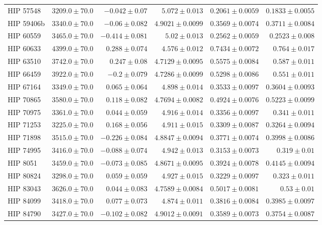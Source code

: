 \begin{longtable*}{lrrrrr}
HIP 57548 & $3209.0\pm 70.0$ & $-0.042\pm 0.07$ & $5.072\pm 0.013$ & $0.2061\pm 0.0059$ & $0.1833\pm 0.0055$ \\ 
HIP 59406b & $3340.0\pm 70.0$ & $-0.06\pm 0.082$ & $4.9021\pm 0.0099$ & $0.3569\pm 0.0074$ & $0.3711\pm 0.0084$ \\ 
HIP 60559 & $3465.0\pm 70.0$ & $-0.414\pm 0.081$ & $5.02\pm 0.013$ & $0.2562\pm 0.0059$ & $0.2523\pm 0.008$ \\ 
HIP 60633 & $4399.0\pm 70.0$ & $0.288\pm 0.074$ & $4.576\pm 0.012$ & $0.7434\pm 0.0072$ & $0.764\pm 0.017$ \\ 
HIP 63510 & $3742.0\pm 70.0$ & $0.247\pm 0.08$ & $4.7129\pm 0.0095$ & $0.5575\pm 0.0084$ & $0.587\pm 0.011$ \\ 
HIP 66459 & $3922.0\pm 70.0$ & $-0.2\pm 0.079$ & $4.7286\pm 0.0099$ & $0.5298\pm 0.0086$ & $0.551\pm 0.011$ \\ 
HIP 67164 & $3349.0\pm 70.0$ & $0.065\pm 0.064$ & $4.898\pm 0.014$ & $0.3533\pm 0.0097$ & $0.3604\pm 0.0093$ \\ 
HIP 70865 & $3580.0\pm 70.0$ & $0.118\pm 0.082$ & $4.7694\pm 0.0082$ & $0.4924\pm 0.0076$ & $0.5223\pm 0.0099$ \\ 
HIP 70975 & $3361.0\pm 70.0$ & $0.044\pm 0.059$ & $4.916\pm 0.014$ & $0.3356\pm 0.0097$ & $0.341\pm 0.011$ \\ 
HIP 71253 & $3225.0\pm 70.0$ & $0.168\pm 0.056$ & $4.911\pm 0.015$ & $0.3309\pm 0.0087$ & $0.3264\pm 0.0094$ \\ 
HIP 71898 & $3515.0\pm 70.0$ & $-0.226\pm 0.084$ & $4.8847\pm 0.0094$ & $0.3771\pm 0.0074$ & $0.3998\pm 0.0086$ \\ 
HIP 74995 & $3416.0\pm 70.0$ & $-0.088\pm 0.074$ & $4.942\pm 0.013$ & $0.3153\pm 0.0073$ & $0.319\pm 0.01$ \\ 
HIP 8051 & $3459.0\pm 70.0$ & $-0.073\pm 0.085$ & $4.8671\pm 0.0095$ & $0.3924\pm 0.0078$ & $0.4145\pm 0.0094$ \\ 
HIP 80824 & $3298.0\pm 70.0$ & $0.059\pm 0.059$ & $4.927\pm 0.015$ & $0.3229\pm 0.0097$ & $0.323\pm 0.011$ \\ 
HIP 83043 & $3626.0\pm 70.0$ & $0.044\pm 0.083$ & $4.7589\pm 0.0084$ & $0.5017\pm 0.0081$ & $0.53\pm 0.01$ \\ 
HIP 84099 & $3418.0\pm 70.0$ & $0.077\pm 0.073$ & $4.874\pm 0.011$ & $0.3816\pm 0.0084$ & $0.3985\pm 0.0097$ \\ 
HIP 84790 & $3427.0\pm 70.0$ & $-0.102\pm 0.082$ & $4.9012\pm 0.0091$ & $0.3589\pm 0.0073$ & $0.3754\pm 0.0087$ \\ 

\end{longtable*}
